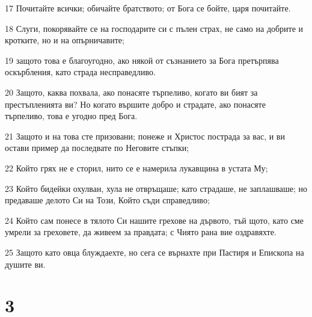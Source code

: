 \par 17 Почитайте всички; обичайте братството; от Бога се бойте, царя почитайте.
\par 18 Слуги, покорявайте се на господарите си с пълен страх, не само на добрите и кротките, но и на опърничавите;
\par 19 защото това е благоугодно, ако някой от съзнанието за Бога претърпява оскърбления, като страда несправедливо.
\par 20 Защото, каква похвала, ако понасяте търпеливо, когато ви бият за престъпленията ви? Но когато вършите добро и страдате, ако понасяте търпеливо, това е угодно пред Бога.
\par 21 Защото и на това сте призовани; понеже и Христос пострада за вас, и ви остави пример да последвате по Неговите стъпки;
\par 22 Който грях не е сторил, нито се е намерила лукавщина в устата Му;
\par 23 Който бидейки охулван, хула не отвръщаше; като страдаше, не заплашваше; но предаваше делото Си на Този, Който съди справедливо;
\par 24 Който сам понесе в тялото Си нашите грехове на дървото, тъй щото, като сме умрели за греховете, да живеем за правдата; с Чиято рана вие оздравяхте.
\par 25 Защото като овца блуждаехте, но сега се върнахте при Пастиря и Епископа на душите ви.

\chapter{3}

